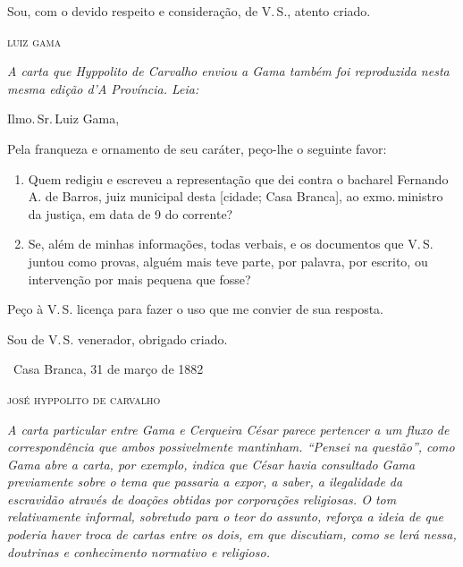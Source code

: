 Sou, com o devido respeito e consideração, de V.\,S., atento criado.\medskip

\hfill\textsc{luiz gama}

\pagebreak
\noindent\dotfill

\begin{resumo}\itshape 
A carta que Hyppolito de Carvalho enviou a Gama também foi reproduzida
  nesta mesma edição d'\emph{A Província}. Leia:
\end{resumo}

Ilmo.\,Sr.\,Luiz Gama,

Pela franqueza e ornamento de seu caráter, peço-lhe o seguinte favor:

\begin{enumerate}[label=\arabic*º:]
\item Quem redigiu e escreveu a representação que dei contra o bacharel
Fernando A. de Barros, juiz municipal desta {[}cidade; Casa Branca{]},
ao exmo.\,ministro da justiça, em data de 9 do corrente?

\item Se, além de minhas informações, todas verbais, e os documentos que
V.\,S. juntou como provas, alguém mais teve parte, por palavra, por
escrito, ou intervenção por mais pequena que fosse?
\end{enumerate}

Peço à V.\,S. licença para fazer o uso que me convier de sua resposta.

Sou de V.\,S. venerador, obrigado criado.\medskip

\hfill\ Casa Branca, 31 de março de 1882

\hfill\textsc{josé hyppolito de carvalho}


\begin{resumo}
\emph{A carta particular entre Gama e Cerqueira César parece pertencer a
um fluxo de correspondência que ambos possivelmente mantinham. ``Pensei
na questão'', como Gama abre a carta, por exemplo, indica que César havia
consultado Gama previamente sobre o tema que passaria a expor, a saber,
a ilegalidade da escravidão através de doações obtidas por corporações
religiosas. O tom relativamente informal, sobretudo para o teor do
assunto, reforça a ideia de que poderia haver troca de cartas entre os
dois, em que discutiam, como se lerá nessa, doutrinas e conhecimento
normativo e religioso. }
\end{resumo}


